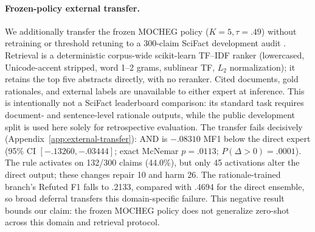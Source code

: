 \documentclass[11pt]{article}
\begin{document}
\paragraph{Frozen-policy external transfer.}
We additionally transfer the frozen MOCHEG policy ($K=5,\tau=.49$) without retraining or threshold retuning to a 300-claim SciFact development audit \citep{wadden2020scifact}. Retrieval is a deterministic corpus-wide scikit-learn TF--IDF ranker (lowercased, Unicode-accent stripped, word 1--2 grams, sublinear TF, $L_2$ normalization); it retains the top five abstracts directly, with no reranker. Cited documents, gold rationales, and external labels are unavailable to either expert at inference. This is intentionally not a SciFact leaderboard comparison: its standard task requires document- and sentence-level rationale outputs, while the public development split is used here solely for retrospective evaluation. The transfer fails decisively (Appendix~\ref{app:external-transfer}): AND is $-.08310$ MF1 below the direct expert (95\% CI $[-.13260,-.03444]$; exact McNemar $p=.0113$; $P(\Delta>0)=.0001$). The rule activates on 132/300 claims (44.0\%), but only 45 activations alter the direct output; these changes repair 10 and harm 26. The rationale-trained branch's Refuted F1 falls to .2133, compared with .4694 for the direct ensemble, so broad deferral transfers this domain-specific failure. This negative result bounds our claim: the frozen MOCHEG policy does not generalize zero-shot across this domain and retrieval protocol.
\end{document}
